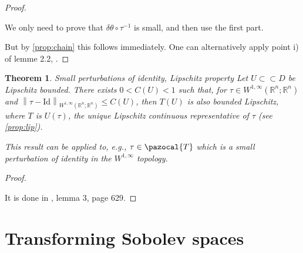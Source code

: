 \documentclass[english,a4paper,9pt,oneside]{scrbook}	%
\theoremstyle{break}
\newtheorem{thm}[equation]{Theorem}
\newtheorem{prop}[equation]{Proposition}
\newenvironment{mproof}[1][\proofname]{%
  \begin{proof}[#1]$ $\par\nobreak\ignorespaces
}{%
  \end{proof}
}
\renewcommand*{\proofname}{Proof}
\theoremstyle{remark}
\newcommand{\mR}{\mathbb{R}}
\newcommand{\norm}[1]{\left\lVert#1\right\rVert}
\newcommand{\cc}{\subset\subset}
\newcommand{\cT}{\pazocal{T}}
\newcommand{\id}{\text{Id}}
\newcommand{\te}{\theta}
\newcommand{\Te}{\Theta}
\begin{document}
\begin{appendices}
\begin{mproof}
We only need to prove that $\delta \te \circ \tau^{-1}$ is small, and then use the first part. 

But by \cref{prop:chain} this follows immediately. One can alternatively apply point i) of lemme 2.2, \cite{murat}.

\end{mproof}

\begin{thm}{Small perturbations of identity, Lipschitz property}
\label{thm:ptb_id_lip}
Let $U\cc D$ be Lipschitz bounded. There exists $0<C(U)<1$ such that, for $\tau \in W^{1,\infty}(\mR^n;\mR^n)$ and $\norm{\tau - \id}_{W^{1,\infty}(\mR^n;\mR^n)}\leq C(U)$, then $T(U)$ is also bounded Lipschitz, where $T$ is $U(\tau)$, the unique Lipschitz continuous representative of $\tau$ (see \cref{prop:lip}).

This result can be applied to, e.g., $\tau \in \cT$ which is a small perturbation of identity in the $W^{1,\infty}$ topology.
\end{thm}

\begin{mproof}
It is done in \cite{bello}, lemma 3, page 629.
\end{mproof}

%
%
%
%
%
%
%
%
%
%
%

\section{Transforming Sobolev spaces}


\end{appendices}
\end{document}
